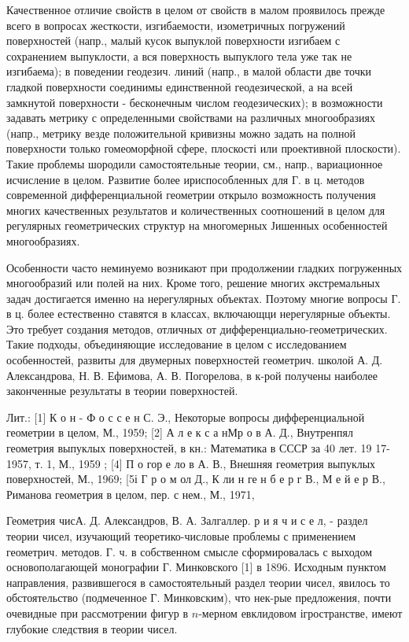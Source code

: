 \documentclass[10pt]{article}
\begin{document}
Качественное отличие свойств в целом от свойств в малом проявилось прежде всего в вопросах жесткости, изгибаемости, изометричных погружений поверхностей (напр., малый кусок выпуклой поверхности изгибаем с сохранением выпуклости, а вся поверхность выпуклого тела уже так не изгибаема); в поведении геодезич. линий (напр., в малой области две точки гладкой поверхности соединимы единственной геодезической, а на всей замкнутой поверхности - бесконечным числом геодезических); в возможности задавать метрику с определенными свойствами на различных многообразиях (напр., метрику везде положительной кривизны можно задать на полной поверхности только гомеоморфной сфере, плоскості или проективной плоскости). Такие проблемы шородили самостоятельные теории, см., напр., вариационное исчисление в целом. Развитие более ириспособленных для Г. в ц. методов современной дифференциальной геометрии открыло возможность получения многих качественных результатов и количественных соотношений в целом для регулярных геометрических структур на многомерных Јишенных особенностей многообразиях.



Особенности часто неминуемо возникают при продолжении гладких погруженных многообразий или полей на них. Кроме того, решение многих әкстремальных задач достигается именно на нерегулярных объектах. Поэтому многие вопросы $Г$. в ц. более естественно ставятся в классах, включающци нерегулярные объекты. Это требует создания методов, отличных от дифференциально-геометрических. Такие подходы, объединяющие исследование в целом с исследованием особенностей, развиты для двумерных поверхностей геометрич. школой А. Д. Александрова, Н. В. Ефимова, А. В. Погорелова, в к-рой получены наиболее законченные результаты в теории поверхностей.



Лит.: [1] К о н - Ф о с с е н С. Э., Некоторые вопросы дифференциальной геометрии в целом, М., 1959; [2] А л е к с а нМр о в А. Д., Внутренпял геометрия выпуклых поверхностей, в кн.: Математика в СССР за 40 лет. 19 17-1957, т. 1, М., 1959 ; [4] П о гор е ло в А. В., Внешняя геометрия выпуклых поверхностей, М., 1969; [5і Г р о м ол Д., К ли н ге н б е р г В., М е й е р В., Риманова геометрия в целом, пер. с нем., М., 1971,



Геометрия чисА. Д. Александров, В. А. Залгаллер. р и я ч и с е л, - раздел теории чисел, изучающий теоретико-числовые проблемы с применением геометрич. методов. Г. ч. в собственном смысле сформировалась с выходом основополагающей монографии Г. Минковского [1] в 1896. Исходным пунктом направления, развившегося в самостоятельный раздел теории чисел, явилось то обстоятельство (подмеченное Г. Минковским), что нек-рые предложения, почти очевидные при рассмотрении фигур в $n$-мерном евклидовом ігространстве, имеют глубокие следствия в теории чисел.
\end{document}
